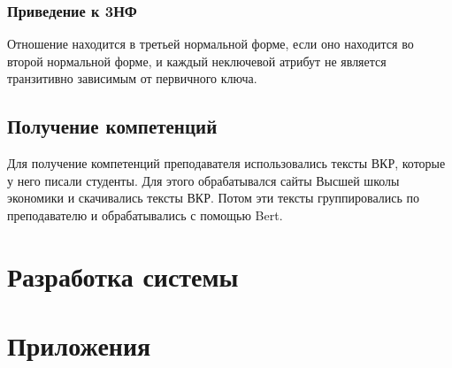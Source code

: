 \documentclass[PI,KR]{HSEUniversity}
\begin{document}
\subsection{Приведение к 3НФ}
Отношение находится в третьей нормальной форме, если оно находится во второй нормальной форме, и каждый неключевой атрибут не является транзитивно зависимым от первичного ключа.
\section{Получение компетенций}
Для получение компетенций преподавателя использовались тексты ВКР, которые у него писали студенты. Для этого обрабатывался сайты Высшей школы экономики и скачивались тексты ВКР. Потом эти тексты группировались по преподавателю и обрабатывались с помощью Bert. 
\chapter{Разработка системы}


\putbibliography %
\chapter*{Приложения}
\end{document}

